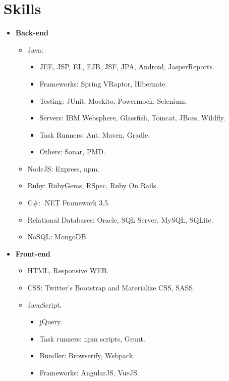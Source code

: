 \documentclass[12pt,a4paper]{moderncv}
\begin{document}
\section{Skills}
\begin{itemize}
    \item \textbf{Back-end}
        \begin{itemize}
            \item Java:
                \begin{itemize}
                    \item JEE, JSP, EL, EJB, JSF, JPA, Android, JasperReports.
                    \item Frameworks: Spring VRaptor, Hibernate.
                    \item Testing: JUnit, Mockito, Powermock, Selenium.
                    \item Servers: IBM Websphere, Glassfish, Tomcat, JBoss, Wildfly.
                    \item Task Runners: Ant, Maven, Gradle.
                    \item Others: Sonar, PMD.
                \end{itemize}
            \item NodeJS: Express, npm.
            \item Ruby: RubyGems, RSpec, Ruby On Rails.
            \item C\#: .NET Framework 3.5.
            \item Relational Databases: Oracle, SQL Server, MySQL, SQLite.
            \item NoSQL: MongoDB.
        \end{itemize}
    \item \textbf{Front-end}
        \begin{itemize}
            \item HTML, Responsive WEB.
            \item CSS: Twitter's Bootstrap and Materialize CSS, SASS.
            \item JavaScript.
                \begin{itemize}
                    \item jQuery.
                    \item Task runners: npm scripts, Grunt.
                    \item Bundler: Browserify, Webpack.
                    \item Frameworks: AngularJS, VueJS.
                \end{itemize}

\end{itemize}
\end{itemize}
\end{document}
